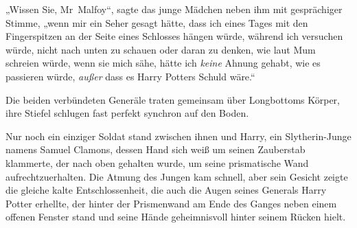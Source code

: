 „Wissen Sie, Mr~Malfoy“, sagte das junge Mädchen neben ihm mit gesprächiger Stimme, „wenn mir ein Seher gesagt hätte, dass ich eines Tages mit den Fingerspitzen an der Seite eines Schlosses hängen würde, während ich versuchen würde, nicht nach unten zu schauen oder daran zu denken, wie laut Mum schreien würde, wenn sie mich sähe, hätte ich \emph{keine} Ahnung gehabt, wie es passieren würde, \emph{außer} dass es Harry Potters Schuld wäre.“


Die beiden verbündeten Generäle traten gemeinsam über Longbottoms Körper, ihre Stiefel schlugen fast perfekt synchron auf den Boden.

Nur noch ein einziger Soldat stand zwischen ihnen und Harry, ein Slytherin-Junge namens Samuel Clamons, dessen Hand sich weiß um seinen Zauberstab klammerte, der nach oben gehalten wurde, um seine prismatische Wand aufrechtzuerhalten. Die Atmung des Jungen kam schnell, aber sein Gesicht zeigte die gleiche kalte Entschlossenheit, die auch die Augen seines Generals Harry Potter erhellte, der hinter der Prismenwand am Ende des Ganges neben einem offenen Fenster stand und seine Hände geheimnisvoll hinter seinem Rücken hielt.

